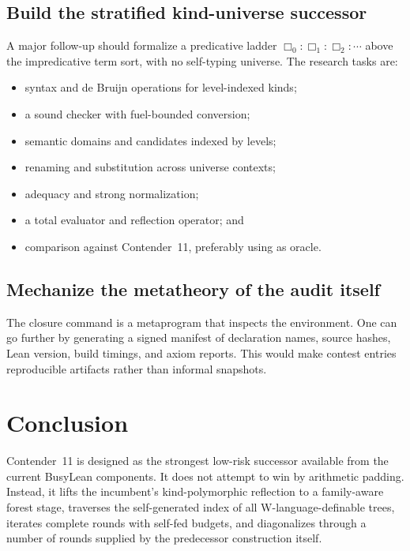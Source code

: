 \documentclass[11pt]{article}
\theoremstyle{definition}
\theoremstyle{remark}
\newcommand{\lean}[1]{\texttt{\detokenize{#1}}}
\begin{document}
\subsection{Build the stratified kind-universe successor}

A major follow-up should formalize a predicative ladder
$\Box_0:\Box_1:\Box_2:\cdots$ above the impredicative term sort, with no
self-typing universe. The research tasks are:

\begin{itemize}[leftmargin=*]
\item syntax and de Bruijn operations for level-indexed kinds;
\item a sound checker with fuel-bounded conversion;
\item semantic domains and candidates indexed by levels;
\item renaming and substitution across universe contexts;
\item adequacy and strong normalization;
\item a total evaluator and reflection operator; and
\item comparison against Contender~11, preferably using \lean{F11} as oracle.
\end{itemize}

\subsection{Mechanize the metatheory of the audit itself}

The closure command is a metaprogram that inspects the environment. One can go
further by generating a signed manifest of declaration names, source hashes,
Lean version, build timings, and axiom reports. This would make contest entries
reproducible artifacts rather than informal snapshots.

\section{Conclusion}

Contender~11 is designed as the strongest low-risk successor available from the
current BusyLean components. It does not attempt to win by arithmetic padding.
Instead, it lifts the incumbent's kind-polymorphic reflection to a family-aware
forest stage, traverses the self-generated index of all W-language-definable
trees, iterates complete rounds with self-fed budgets, and diagonalizes through
a number of rounds supplied by the predecessor construction itself.
\end{document}
